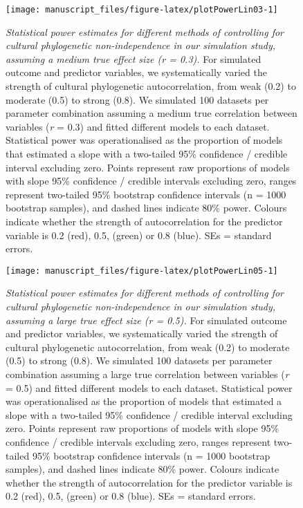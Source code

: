 \documentclass[
  man,floatsintext]{apa6}
\begin{document}
\newpage



\begin{figure}[H]
\texttt{[image: manuscript\_files/figure-latex/plotPowerLin03-1]} \caption{\emph{Statistical power estimates for different methods of controlling for cultural phylogenetic non-independence in our simulation study, assuming a medium true effect size (r = 0.3).} For simulated outcome and predictor variables, we systematically varied the strength of cultural phylogenetic autocorrelation, from weak (0.2) to moderate (0.5) to strong (0.8). We simulated 100 datasets per parameter combination assuming a medium true correlation between variables (\emph{r} = 0.3) and fitted different models to each dataset. Statistical power was operationalised as the proportion of models that estimated a slope with a two-tailed 95\% confidence / credible interval excluding zero. Points represent raw proportions of models with slope 95\% confidence / credible intervals excluding zero, ranges represent two-tailed 95\% bootstrap confidence intervals (n = 1000 bootstrap samples), and dashed lines indicate 80\% power. Colours indicate whether the strength of autocorrelation for the predictor variable is 0.2 (red), 0.5, (green) or 0.8 (blue). SEs = standard errors.}\label{fig:plotPowerLin03}
\end{figure}

\newpage



\begin{figure}[H]
\texttt{[image: manuscript\_files/figure-latex/plotPowerLin05-1]} \caption{\emph{Statistical power estimates for different methods of controlling for cultural phylogenetic non-independence in our simulation study, assuming a large true effect size (r = 0.5).} For simulated outcome and predictor variables, we systematically varied the strength of cultural phylogenetic autocorrelation, from weak (0.2) to moderate (0.5) to strong (0.8). We simulated 100 datasets per parameter combination assuming a large true correlation between variables (\emph{r} = 0.5) and fitted different models to each dataset. Statistical power was operationalised as the proportion of models that estimated a slope with a two-tailed 95\% confidence / credible interval excluding zero. Points represent raw proportions of models with slope 95\% confidence / credible intervals excluding zero, ranges represent two-tailed 95\% bootstrap confidence intervals (n = 1000 bootstrap samples), and dashed lines indicate 80\% power. Colours indicate whether the strength of autocorrelation for the predictor variable is 0.2 (red), 0.5, (green) or 0.8 (blue). SEs = standard errors.}\label{fig:plotPowerLin05}
\end{figure}
\end{document}

